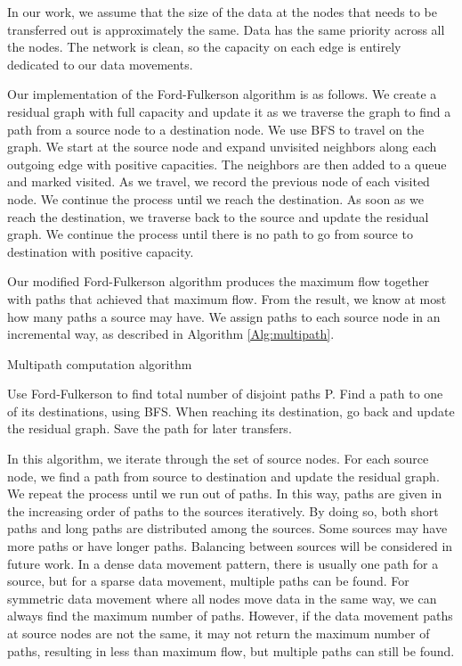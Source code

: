 \documentclass[final,5p,times]{elsarticle}
\begin{document}
In our work, we assume that the size of the data at the nodes that needs to be transferred out is approximately the same. Data has the same priority across all the nodes. The network is clean, so the capacity on each edge is entirely dedicated to our data movements.

Our implementation of the Ford-Fulkerson algorithm is as follows. We create a residual graph with full capacity and update it as we traverse the graph to find a path from a source node to a destination node. We use BFS to travel on the graph. We start at the source node and expand unvisited neighbors along each outgoing edge with positive capacities. The neighbors are then added to a queue and marked visited. As we travel, we record the previous node of each visited node. We continue the process until we reach the destination. As soon as we reach the destination, we traverse back to the source and update the residual graph. We continue the process until there is no path to go from source to destination with positive capacity.

Our modified Ford-Fulkerson algorithm produces the maximum flow together with paths that achieved that maximum flow. From the result,  we know at most how many paths a source may have. We assign paths to each source node in an incremental way, as described in Algorithm \ref{Alg:multipath}.

\begin{algorithm}
\caption{Multipath computation algorithm}
\begin{algorithmic}
	\STATE Use Ford-Fulkerson to find total number of disjoint paths P.
	\STATE Find a path to one of its destinations, using BFS.
	\STATE When reaching its destination, go back and update the residual graph.
	\STATE Save the path for later transfers.
	\ENDFOR
	\ENDFOR
\end{algorithmic}
\label{Alg:multipath}
\end{algorithm}

In this algorithm, we iterate through the set of source nodes. For each source node, we find a path from source to destination and update the residual graph. We repeat the process until we run out of paths. In this way, paths are given in the increasing order of paths to the sources iteratively. By doing so, both short paths and long paths are distributed among the sources. Some sources may have more paths or have longer paths. Balancing between sources will be considered in future work. In a dense data movement pattern, there is usually one path for a source, but for a sparse data movement, multiple paths can be found. For symmetric data movement where all nodes move data in the same way, we can always find the maximum number of paths. However, if the data movement paths at source nodes are not the same, it may not return the maximum number of paths, resulting in less than maximum flow, but multiple paths can still be found.
\end{document}
